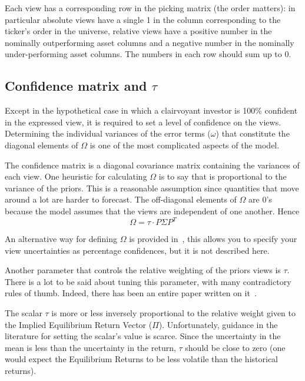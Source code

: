Each view has a corresponding row in the picking matrix (the order matters): in particular absolute views have a single 1 in the column corresponding to the ticker’s order in the universe, relative views have a positive number in the nominally outperforming asset columns and a negative number in the nominally under-performing asset columns. The numbers in each row should sum up to 0.

\subsection{Confidence matrix and $\tau$}

Except in the hypothetical case in which a clairvoyant investor is 100\% confident in the expressed view, it is required to set a level of confidence on the views. Determining the individual variances of the error terms ($\omega$) that constitute the diagonal elements of $\Omega$ is one of the most complicated aspects of the model.

The confidence matrix is a diagonal covariance matrix containing the variances of each view. One heuristic for calculating $\Omega$ is to say that is proportional to the variance of the priors. This is a reasonable assumption since quantities that move around a lot are harder to forecast. The off-diagonal elements of $\Omega$ are 0’s because the model assumes that the views are independent of one another. Hence
\begin{equation}
	\Omega = \tau \cdot P\Sigma P^T
\end{equation}

An alternative way for defining $\Omega$ is provided in~\cite{bib:Idzorek}, this allows you to specify your view uncertainties as percentage confidences, but it is not described here.

Another parameter that controls the relative weighting of the priors views is $\tau$. There is a lot to be said about tuning this parameter, with many contradictory rules of thumb. Indeed, there has been an entire paper written on it~\cite{bib:tau}.

The scalar $\tau$ is more or less inversely proportional to the relative weight given to the Implied Equilibrium Return Vector ($\Pi$). Unfortunately, guidance in the literature for setting the scalar’s value is scarce. Since the uncertainty in the mean is less than the uncertainty in the return, $\tau$ should be close to zero (one would expect the Equilibrium Returns to be less volatile than the historical returns).

